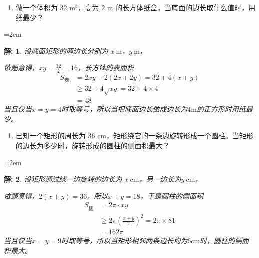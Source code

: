 \documentclass[aspectratio=169,13pt,fleqn,t] {beamer}
\newtheorem*{solve}{解:}
\begin{document}
\begin{frame}
	\begin{enumerate}[3.]
		\item 做一个体积为 \(32\text{ m}^3\)，高为 \(2\text{ m}\) 的长方体纸盒，当底面的边长取什么值时，用纸最少？
	\end{enumerate}
	
	\leftskip=2em
	\begin{minipage}{0.8\textwidth}
		
		\begin{solve}
			设底面矩形的两边长分别为 $x\ \mathrm{m}$，$y\ \mathrm{m}$，
			
			依题意得，$xy=\frac{32}{2} = 16$，长方体的表面积	
			\begin{align*}
			S_{\text{表}}&=2xy + 2(2x+2y) =32 + 4 (x+y)\\
			&\geqslant 32 + 4\sqrt{xy} = 32+4\times 4 \\
			&=48 
			\end{align*}
			当且仅当$x=y=4$时取等号，所以当把底面边长做成边长为$4\mathrm{m}$的正方形时用纸最少。
		\end{solve}
	\end{minipage}
	
\end{frame}

\begin{frame}
	\begin{enumerate}[4.]
		\item 已知一个矩形的周长为 \(36\text{ cm}\)，矩形绕它的一条边旋转形成一个圆柱。当矩形的边长为多少时，旋转形成的圆柱的侧面积最大？
	\end{enumerate}
	
	\leftskip=2em
	\begin{minipage}{0.8\textwidth}
		
		\begin{solve}
			设矩形通过绕一边旋转的边长为 $x\ \mathrm{cm}$，另一边长为$y\ \mathrm{cm}$，
			
			依题意得，$2(x+y)=36$，所以$x+y=18$，于是圆柱的侧面积
			\begin{align*}
				S_{\text{侧}}&=2\pi \cdot xy \\
				&\geqslant 2\pi \left(\frac{x+y}{2} \right)^2= 2\pi \times 81 \\
				&=162\pi 
			\end{align*}
			当且仅当$x=y=9$时取等号，所以当矩形相邻两条边长均为$6\mathrm{cm}$时，圆柱的侧面积最大。
		\end{solve}
	\end{minipage}
	
\end{frame}
\end{document}
